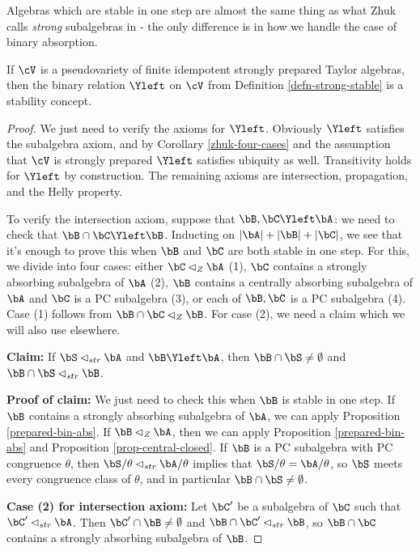 Algebras which are stable in one step are almost the same thing as what Zhuk calls \emph{strong} subalgebras in \cite{zhuk-strong} - the only difference is in how we handle the case of binary absorption.

\begin{thm} If $\cV$ is a pseudovariety of finite idempotent strongly prepared Taylor algebras, then the binary relation $\Yleft$ on $\cV$ from Definition \ref{defn-strong-stable} is a stability concept.
\end{thm}
\begin{proof} We just need to verify the axioms for $\Yleft$. Obviously $\Yleft$ satisfies the subalgebra axiom, and by Corollary \ref{zhuk-four-cases} and the assumption that $\cV$ is strongly prepared $\Yleft$ satisfies ubiquity as well. Transitivity holds for $\Yleft$ by construction. The remaining axioms are intersection, propagation, and the Helly property.

To verify the intersection axiom, suppose that $\bB, \bC \Yleft \bA$: we need to check that $\bB \cap \bC \Yleft \bB$. Inducting on $|\bA| + |\bB| + |\bC|$, we see that it's enough to prove this when $\bB$ and $\bC$ are both stable in one step. For this, we divide into four cases: either $\bC \lhd_Z \bA$ (1), $\bC$ contains a strongly absorbing subalgebra of $\bA$ (2), $\bB$ contains a centrally absorbing subalgebra of $\bA$ and $\bC$ is a PC subalgebra (3), or each of $\bB, \bC$ is a PC subalgebra (4). Case (1) follows from $\bB \cap \bC \lhd_Z \bB$. For case (2), we need a claim which we will also use elsewhere.

{\bf Claim:} If $\bS \lhd_{str} \bA$ and $\bB \Yleft \bA$, then $\bB \cap \bS \ne \emptyset$ and $\bB \cap \bS \lhd_{str} \bB$.

{\bf Proof of claim:} We just need to check this when $\bB$ is stable in one step. If $\bB$ contains a strongly absorbing subalgebra of $\bA$, we can apply Proposition \ref{prepared-bin-abs}. If $\bB \lhd_Z \bA$, then we can apply Proposition \ref{prepared-bin-abs} and Proposition \ref{prop-central-closed}. If $\bB$ is a PC subalgebra with PC congruence $\theta$, then $\bS/\theta \lhd_{str} \bA/\theta$ implies that $\bS/\theta = \bA/\theta$, so $\bS$ meets every congruence class of $\theta$, and in particular $\bB \cap \bS \ne \emptyset$.

{\bf Case (2) for intersection axiom:} Let $\bC'$ be a subalgebra of $\bC$ such that $\bC' \lhd_{str} \bA$. Then $\bC' \cap \bB \ne \emptyset$ and $\bB \cap \bC' \lhd_{str} \bB$, so $\bB \cap \bC$ contains a strongly absorbing subalgebra of $\bB$.


\end{proof}
